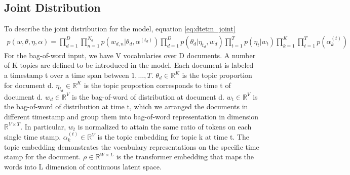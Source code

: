 \subsection{Joint Distribution}
To describe the joint distribution for the model, equation \ref{eq:dtetm_joint}
\begin{align}\label{eq:dtetm_joint}
p(w,\theta,\eta,\alpha)=\prod_{d=1}^{D}\prod_{n=1}^{N_d}p(w_{d,n}|\theta_d,\alpha^{(t_d)})\prod_{d=1}^{D}p(\theta_d|\eta_{t_d},w_d)\prod_{t=1}^{T}p(\eta_t|w_t)\prod_{k=1}^{K}\prod_{t=1}^{T}p(\alpha_k^{(t)})
\end{align}
For the bag-of-word input, we have V vocabularies over D documents. A number of K topics are defined to be introduced in the model. Each document is labeled a timestamp t over a time span between $ 1,\dots,T $.
$\theta_d\in\mathbb{R}^{K}$ is the topic 	proportion for document d.
$\eta_{t_d}\in\mathbb{R}^{K}$ is the topic proportion corresponds to time t of document d.	
$ w_d \in\mathbb{R}^{V}$ is the bag-of-word of distribution at document d.
$ w_t \in\mathbb{R}^{V}$ is the bag-of-word of distribution at time t, which we arranged the documents in different timestamp and group them into bag-of-word representation in dimension $ \mathbb{R}^{V\times T} $. In particular, $ w_t $ is normalized to attain the same ratio of tokens on each single time stamp.
$\alpha_k^{(t)}\in\mathbb{R}^{V}$ is the topic embedding for topic k at time t. The topic embedding demonstrates the vocabulary representations on the specific time stamp for the document.
$ \rho\in\mathbb{R}^{W\times L} $ is the transformer embedding that maps the words into L dimension of continuous latent space. 
